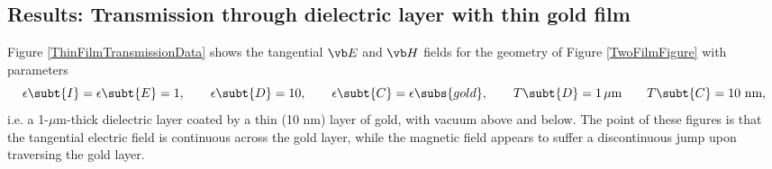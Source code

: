 \documentclass{article}
\begin{document}
\subsection*{Results: Transmission through dielectric layer with thin gold film}

Figure \ref{ThinFilmTransmissionData} shows the tangential $\vb E$ and $\vb H$
fields for the geometry of Figure \ref{TwoFilmFigure} with parameters
$$ \epsilon\subt{I}=\epsilon\subt{E}=1, \qquad
   \epsilon\subt{D}=10, \qquad
   \epsilon\subt{C}=\epsilon\subs{gold}, \qquad
   T\subt{D}=1 \, \mu\text{m} \qquad
   T\subt{C}=10\text{ nm},
$$
i.e. a 1-$\mu$m-thick dielectric layer coated by a thin (10 nm)
layer of gold, with vacuum above and below. The point of these
figures is that the tangential electric field is continuous
across the gold layer, while the magnetic field appears
to suffer a discontinuous jump upon traversing the gold layer.
\end{document}
